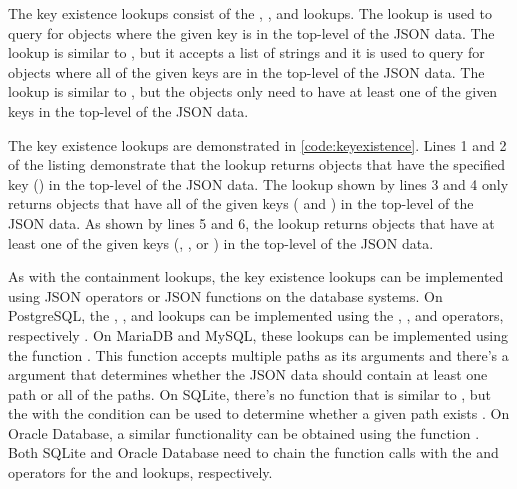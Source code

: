 \noindent
\begin{minipage}{\linewidth}

\end{minipage}

The key existence lookups consist of the , , and
 lookups. The  lookup is used to query for
objects where the given key is in the top-level of the JSON data. The
 lookup is similar to , but it accepts a list of
strings and it is used to query for objects where all of the given keys are
in the top-level of the JSON data. The  lookup is similar
to , but the objects only need to have at least one of the
given keys in the top-level of the JSON data.

The key existence lookups are demonstrated in \autoref{code:keyexistence}.
Lines 1 and 2 of the listing demonstrate that the  lookup
returns objects that have the specified key () in the top-level
of the JSON data. The  lookup shown by lines 3 and 4 only
returns objects that have all of the given keys ( and
) in the top-level of the JSON data. As shown by lines 5
and 6, the  lookup returns objects that have at least one
of the given keys (, , or ) in
the top-level of the JSON data.

As with the containment lookups, the key existence lookups can be implemented
using JSON operators or JSON functions on the database systems. On PostgreSQL,
the , , and  lookups can be
implemented using the , , and  operators,
respectively \cite{postgres:json_operators}. On MariaDB and MySQL, these
lookups can be implemented using the  function
\cite{mariadb:json_contains_path, mysql:json_search}. This function accepts
multiple paths as its arguments and there's a  argument that
determines whether the JSON data should contain at least one path or all of the
paths. On SQLite, there's no function that is similar to
, but the  with the  condition can be used to determine whether a given path exists
\cite{sqlite:json1}. On Oracle Database, a similar functionality can be
obtained using the  function \cite{oracle:json_exists}. Both
SQLite and Oracle Database need to chain the function calls with the 
and  operators for the  and 
lookups, respectively.

